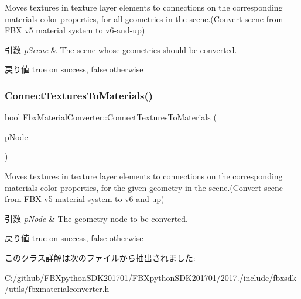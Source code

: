 Moves textures in texture layer elements to connections on the corresponding material\textquotesingle{}s color properties, for all geometries in the scene.(Convert scene from F\+BX v5 material system to v6-\/and-\/up) 
\begin{DoxyParams}{引数}
{\em p\+Scene} & The scene whose geometries should be converted. \\
\hline
\end{DoxyParams}
\begin{DoxyReturn}{戻り値}
true on success, false otherwise 
\end{DoxyReturn}
\mbox{\label{class_fbx_material_converter_a7b1b6da882b2dd935a3e008b2a85b132}} 
\subsubsection{\texorpdfstring{Connect\+Textures\+To\+Materials()}{ConnectTexturesToMaterials()}\hspace{0.1cm}{\footnotesize\ttfamily [2/2]}}
{\footnotesize\ttfamily bool Fbx\+Material\+Converter\+::\+Connect\+Textures\+To\+Materials (\begin{DoxyParamCaption}\item[{\hyperlink{class_fbx_node}{Fbx\+Node} $\ast$}]{p\+Node }\end{DoxyParamCaption})}

Moves textures in texture layer elements to connections on the corresponding material\textquotesingle{}s color properties, for the given geometry in the scene.(Convert scene from F\+BX v5 material system to v6-\/and-\/up) 
\begin{DoxyParams}{引数}
{\em p\+Node} & The geometry node to be converted. \\
\hline
\end{DoxyParams}
\begin{DoxyReturn}{戻り値}
true on success, false otherwise 
\end{DoxyReturn}


このクラス詳解は次のファイルから抽出されました\+:\begin{DoxyCompactItemize}
\item 
C\+:/github/\+F\+B\+Xpython\+S\+D\+K201701/\+F\+B\+Xpython\+S\+D\+K201701/2017./include/fbxsdk/utils/\hyperlink{fbxmaterialconverter_8h}{fbxmaterialconverter.\+h}\end{DoxyCompactItemize}
